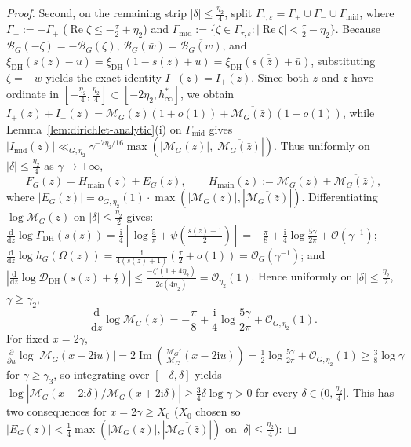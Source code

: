 \documentclass[11pt,a4paper,reqno]{amsart}
\theoremstyle{definition}
\theoremstyle{remark}
\numberwithin{equation}{section}
\newcommand{\dd}{\mathrm{d}}
\newcommand{\ii}{\mathrm{i}}
\DeclareMathOperator{\Reop}{Re}
\DeclareMathOperator{\Imop}{Im}
\begin{document}
\begin{proof}
Second, on the remaining strip $|\delta| \le \frac{\eta_2}{4}$, split $\Gamma_{\tau,\varepsilon} = \Gamma_+ \cup \Gamma_- \cup \Gamma_{\mathrm{mid}}$, where $\Gamma_- := -\Gamma_+$ ($\Reop\zeta \le -\frac{\tau}{2} + \eta_2$) and $\Gamma_{\mathrm{mid}} := \{\zeta \in \Gamma_{\tau,\varepsilon} : |\Reop\zeta| < \frac{\tau}{2} - \eta_2\}$. Because $\mathcal{B}_G(-\zeta) = -\mathcal{B}_G(\zeta)$, $\mathcal{B}_G(\bar{w}) = \overline{\mathcal{B}_G(w)}$, and $\xi_{\mathrm{DH}}(s(z) - u) = \xi_{\mathrm{DH}}(1 - s(z) + u) = \overline{\xi_{\mathrm{DH}}(s(\bar{z}) + \bar{u})}$, substituting $\zeta = -\bar{w}$ yields the exact identity $I_-(z) = \overline{I_+(\bar{z})}$. Since both $z$ and $\bar{z}$ have ordinate in $[-\frac{\eta_2}{4}, \frac{\eta_2}{4}] \subset [-2\eta_2, h_\infty^*]$, we obtain $I_+(z) + I_-(z) = \mathcal{M}_G(z)(1 + o(1)) + \overline{\mathcal{M}_G(\bar{z})}(1 + o(1))$, while Lemma~\ref{lem:dirichlet-analytic}(i) on $\Gamma_{\mathrm{mid}}$ gives $|I_{\mathrm{mid}}(z)| \ll_{G,\eta_2} \gamma^{-7\eta_2/16}\max(|\mathcal{M}_G(z)|, |\overline{\mathcal{M}_G(\bar{z})}|)$. Thus uniformly on $|\delta| \le \frac{\eta_2}{4}$ as $\gamma \to +\infty$,
\begin{equation}
  F_G(z) = H_{\mathrm{main}}(z) + E_G(z),
  \qquad
  H_{\mathrm{main}}(z) := \mathcal{M}_G(z) + \overline{\mathcal{M}_G(\bar{z})},
  \label{eq:hmain-decomp}
\end{equation}
where $|E_G(z)| = o_{G,\eta_2}(1)\cdot\max(|\mathcal{M}_G(z)|, |\overline{\mathcal{M}_G(\bar{z})}|)$. Differentiating $\log\mathcal{M}_G(z)$ on $|\delta| \le \frac{\eta_2}{2}$ gives: $\frac{\dd}{\dd z}\log\Gamma_{\mathrm{DH}}(s(z)) = \frac{\ii}{4}[\log\frac{5}{\pi} + \psi(\frac{s(z)+1}{2})] = -\frac{\pi}{8} + \frac{\ii}{4}\log\frac{5\gamma}{2\pi} + \mathcal{O}(\gamma^{-1})$; $\frac{\dd}{\dd z}\log h_G(\Omega(z)) = \frac{\ii}{4(s(z)+1)}(\frac{\tau}{2} + o(1)) = \mathcal{O}_G(\gamma^{-1})$; and $|\frac{\dd}{\dd z}\log\mathcal{D}_{\mathrm{DH}}(s(z) + \frac{\tau}{2})| \le \frac{-\zeta'(1 + 4\eta_2)}{2c(4\eta_2)} = \mathcal{O}_{\eta_2}(1)$. Hence uniformly on $|\delta| \le \frac{\eta_2}{2}$, $\gamma \ge \gamma_2$,
\begin{equation}
  \frac{\dd}{\dd z}\log\mathcal{M}_G(z)
  = -\frac{\pi}{8} + \frac{\ii}{4}\log\frac{5\gamma}{2\pi} + \mathcal{O}_{G,\eta_2}(1).
  \label{eq:log-deriv-M}
\end{equation}
For fixed $x = 2\gamma$, $\frac{\partial}{\partial u}\log|\mathcal{M}_G(x - 2\ii u)| = 2\Imop(\frac{\mathcal{M}_G'}{\mathcal{M}_G}(x - 2\ii u)) = \frac{1}{2}\log\frac{5\gamma}{2\pi} + \mathcal{O}_{G,\eta_2}(1) \ge \frac{3}{8}\log\gamma$ for $\gamma \ge \gamma_3$, so integrating over $[-\delta, \delta]$ yields $\log|\mathcal{M}_G(x - 2\ii\delta)/\overline{\mathcal{M}_G(x + 2\ii\delta)}| \ge \frac{3}{4}\delta\log\gamma > 0$ for every $\delta \in (0, \frac{\eta_2}{4}]$. This has two consequences for $x = 2\gamma \ge X_0$ ($X_0$ chosen so $|E_G(z)| < \frac{1}{4}\max(|\mathcal{M}_G(z)|, |\overline{\mathcal{M}_G(\bar{z})}|)$ on $|\delta| \le \frac{\eta_2}{4}$):

\end{proof}
\end{document}
